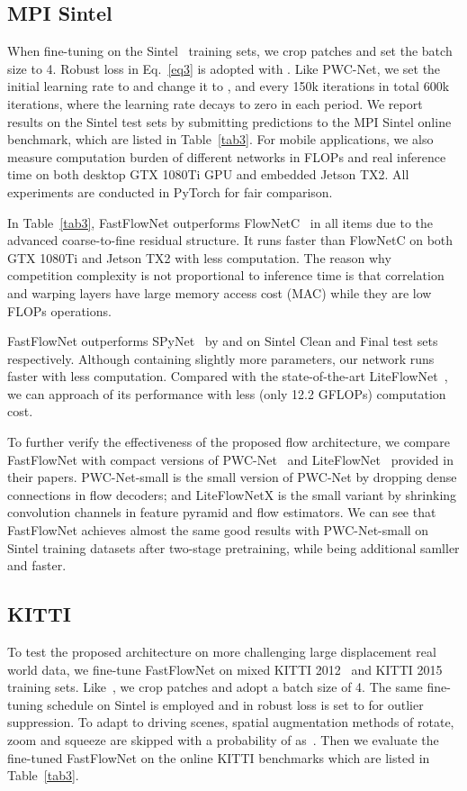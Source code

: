\documentclass[letterpaper, 10 pt, conference]{ieeeconf}
\begin{document}
\subsection{MPI Sintel}

When fine-tuning on the Sintel~\cite{Butler_2012} training sets, we crop  patches and set the batch size to 4. Robust loss in Eq.~\ref{eq3} is adopted with . Like PWC-Net, we set the initial learning rate to  and change 
it to ,  and  every 150k iterations in total 600k iterations,  
where the learning rate decays to zero in each period. We report results on the Sintel test sets by submitting predictions to the MPI Sintel online benchmark, which are listed in Table~\ref{tab3}. For mobile applications, we also measure computation burden of different networks in FLOPs and real inference time 
on both desktop GTX 1080Ti GPU and embedded Jetson TX2. All experiments are conducted in PyTorch for fair comparison.

In Table~\ref{tab3}, FastFlowNet outperforms FlowNetC~\cite{Fischer_2015} in all items due to the advanced coarse-to-fine residual structure. It runs  faster than FlowNetC on both GTX 1080Ti and Jetson TX2 with  less computation. The reason why competition complexity is not proportional to inference time 
is that correlation and warping layers have large memory access cost (MAC) while they are low FLOPs operations. 


FastFlowNet outperforms SPyNet~\cite{Ranjan_2017} by  and  on Sintel Clean and Final test sets respectively. Although containing slightly 
more parameters, our network runs  faster with  less computation. Compared with the state-of-the-art LiteFlowNet~\cite{Hui_2018_CVPR}, we can approach  of its performance with  less (only 12.2 GFLOPs) computation cost.

To further verify the effectiveness of the proposed flow architecture, we compare FastFlowNet with compact 
versions of PWC-Net~\cite{Sun_2018_CVPR} and LiteFlowNet~\cite{Hui_2018_CVPR} provided in their papers. PWC-Net-small is the small version of PWC-Net by dropping dense connections in flow decoders;  and LiteFlowNetX is the small variant by shrinking convolution channels in feature pyramid and flow estimators. We can see that FastFlowNet achieves 
almost the same good results with PWC-Net-small on Sintel training datasets after two-stage pretraining, while being additional  samller and  faster.

\subsection{KITTI}
To test the proposed architecture on more challenging large displacement real world data, we fine-tune FastFlowNet on mixed KITTI 2012~\cite{Geiger2012CVPR} and KITTI 2015~\cite{7298925} training sets. Like~\cite{Ilg_2017, Sun_2018_CVPR, Hui_2018_CVPR}, we crop  patches and adopt a batch size of 4. The same fine-tuning schedule on Sintel is employed and  in robust loss is set to  for outlier suppression. To adapt to driving scenes, spatial augmentation methods of rotate, zoom and squeeze are skipped with a probability of  as~\cite{Sun_2018_CVPR, Hui_2018_CVPR}. Then we evaluate the  fine-tuned FastFlowNet on the online KITTI benchmarks which are listed in Table~\ref{tab3}.
\end{document}

